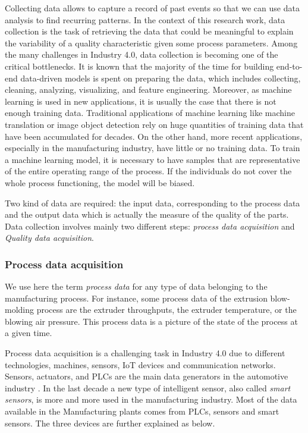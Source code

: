 Collecting data allows to capture a record of past events so that we can use data analysis to find recurring patterns. In the context of this research work, data collection is the task of retrieving the data that could be meaningful to explain the variability of a quality characteristic given some process parameters. Among the many challenges in Industry 4.0, data collection is becoming one of the critical bottlenecks. It is known that the majority of the time for building end-to-end data-driven models is spent on preparing the data, which includes collecting, cleaning, analyzing, visualizing, and feature engineering. Moreover, as machine learning is used in new applications, it is usually the case that there is not enough training data. Traditional applications of machine learning like machine translation or image object detection rely on huge quantities of training data that have been accumulated for decades. On the other hand, more recent applications, especially in the manufacturing industry, have little or no training data. To train a machine learning model, it is necessary to have samples that are representative of the entire operating range of the process. If the individuals do not cover the whole process functioning, the model will be biased.

Two kind of data are required: the input data, corresponding to the process data and the output data which is actually the measure of the quality of the parts. Data collection involves mainly two different steps: \textit{process data acquisition} and \textit{Quality data acquisition}. 

\subsubsection{Process data acquisition} \label{Process Data Acquisition}

We use here the term \textit{process data} for any type of data belonging to the manufacturing process. For instance, some process data of the extrusion blow-molding process are the extruder throughputs, the extruder temperature, or the  blowing air pressure. This process data is a picture of the state of the process at a given time.

Process data acquisition is a challenging task in Industry 4.0 due to different technologies, machines, sensors, IoT devices and communication networks. Sensors, actuators, and PLCs are the main data generators in the automotive industry \citep{khan2017big}. In the last decade a new type of intelligent sensor, also called \textit{smart sensors}, is more and more used in the manufacturing industry. Most of the data available in the Manufacturing plants comes from PLCs, sensors and smart sensors. The three devices are further explained as below.

